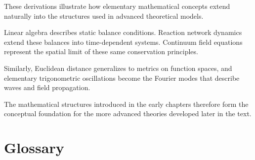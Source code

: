 \documentclass[11pt, openany]{book}
\theoremstyle{plain}
\theoremstyle{definition}
\theoremstyle{remark}
\begin{document}
These derivations illustrate how elementary mathematical concepts
extend naturally into the structures used in advanced theoretical
models.

Linear algebra describes static balance conditions.
Reaction network dynamics extend these balances into time-dependent
systems.
Continuum field equations represent the spatial limit of these same
conservation principles.

Similarly, Euclidean distance generalizes to metrics on function
spaces, and elementary trigonometric oscillations become the Fourier
modes that describe waves and field propagation.

The mathematical structures introduced in the early chapters therefore
form the conceptual foundation for the more advanced theories developed
later in the text.

\backmatter

\chapter*{Glossary}
\end{document}
